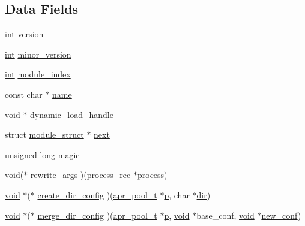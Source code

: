 \subsection*{Data Fields}
\begin{DoxyCompactItemize}
\item 
\hyperlink{pcre_8txt_a42dfa4ff673c82d8efe7144098fbc198}{int} \hyperlink{structmodule__struct_a9fe73d6d2e8c6e3a0cfa0b7f14a1fcef}{version}
\item 
\hyperlink{pcre_8txt_a42dfa4ff673c82d8efe7144098fbc198}{int} \hyperlink{structmodule__struct_a89a9373f6c817795a0580bb2deaef72c}{minor\+\_\+version}
\item 
\hyperlink{pcre_8txt_a42dfa4ff673c82d8efe7144098fbc198}{int} \hyperlink{structmodule__struct_a03b0e116532b88363264cb60d98a919b}{module\+\_\+index}
\item 
const char $\ast$ \hyperlink{structmodule__struct_a88f43c2576387678ac534313fd0e7ece}{name}
\item 
\hyperlink{group__MOD__ISAPI_gacd6cdbf73df3d9eed42fa493d9b621a6}{void} $\ast$ \hyperlink{structmodule__struct_af80ce97e178e8d98add86954cccd09f4}{dynamic\+\_\+load\+\_\+handle}
\item 
struct \hyperlink{structmodule__struct}{module\+\_\+struct} $\ast$ \hyperlink{structmodule__struct_aacf77ae0ad30879346ae153037ed41ea}{next}
\item 
unsigned long \hyperlink{structmodule__struct_a7394965e36ccaa275a5cc4f64ccb354c}{magic}
\item 
\hyperlink{group__MOD__ISAPI_gacd6cdbf73df3d9eed42fa493d9b621a6}{void}($\ast$ \hyperlink{structmodule__struct_a413175b9e3a97400995e7f03d6954dee}{rewrite\+\_\+args} )(\hyperlink{structprocess__rec}{process\+\_\+rec} $\ast$\hyperlink{pcretest_8txt_a8ec73ad58a04604170bd96796a2075a8}{process})
\item 
\hyperlink{group__MOD__ISAPI_gacd6cdbf73df3d9eed42fa493d9b621a6}{void} $\ast$($\ast$ \hyperlink{structmodule__struct_ae3ea1f05d13c0d1e7f7e1fa3a34edf1c}{create\+\_\+dir\+\_\+config} )(\hyperlink{structapr__pool__t}{apr\+\_\+pool\+\_\+t} $\ast$\hyperlink{group__APACHE__CORE__MPM_ga5cd91701e5c167f2b1a38e70ab57817e}{p}, char $\ast$\hyperlink{pcregrep_8txt_a6d902c83b02c43071b972ed0416729bc}{dir})
\item 
\hyperlink{group__MOD__ISAPI_gacd6cdbf73df3d9eed42fa493d9b621a6}{void} $\ast$($\ast$ \hyperlink{structmodule__struct_a7c75a2a7334554c5c92ddfae35bd4ab8}{merge\+\_\+dir\+\_\+config} )(\hyperlink{structapr__pool__t}{apr\+\_\+pool\+\_\+t} $\ast$\hyperlink{group__APACHE__CORE__MPM_ga5cd91701e5c167f2b1a38e70ab57817e}{p}, \hyperlink{group__MOD__ISAPI_gacd6cdbf73df3d9eed42fa493d9b621a6}{void} $\ast$base\+\_\+conf, \hyperlink{group__MOD__ISAPI_gacd6cdbf73df3d9eed42fa493d9b621a6}{void} $\ast$\hyperlink{group__APACHE__CORE__CONFIG_gaceda73e293d0957789ffb6b971897fe6}{new\+\_\+conf})

\end{DoxyCompactItemize}
